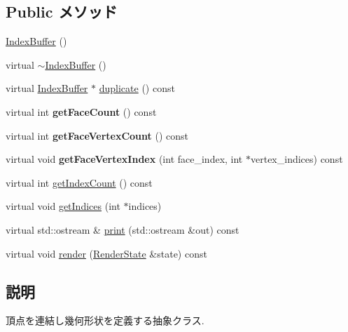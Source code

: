 \subsection*{Public メソッド}
\begin{CompactItemize}
\item 
\hyperlink{classm3g_1_1IndexBuffer_d2e68a2d7c6c753d3abfeef42ee79427}{IndexBuffer} ()
\item 
virtual \hyperlink{classm3g_1_1IndexBuffer_ac7952364fe4d2d7b2731da5380c841c}{$\sim$IndexBuffer} ()
\item 
virtual \hyperlink{classm3g_1_1IndexBuffer}{IndexBuffer} $\ast$ \hyperlink{classm3g_1_1IndexBuffer_fab6fc0a0ec393e527f849c3af10ad76}{duplicate} () const 
\item 
\hypertarget{classm3g_1_1IndexBuffer_f4554e20b080880f27da67c539bb6748}{
virtual int \textbf{getFaceCount} () const }
\label{classm3g_1_1IndexBuffer_f4554e20b080880f27da67c539bb6748}

\item 
\hypertarget{classm3g_1_1IndexBuffer_007506f2b3f5563a65e4cfc1007d57ff}{
virtual int \textbf{getFaceVertexCount} () const }
\label{classm3g_1_1IndexBuffer_007506f2b3f5563a65e4cfc1007d57ff}

\item 
\hypertarget{classm3g_1_1IndexBuffer_d2721de0db09f6c65d9d4b088a269171}{
virtual void \textbf{getFaceVertexIndex} (int face\_\-index, int $\ast$vertex\_\-indices) const }
\label{classm3g_1_1IndexBuffer_d2721de0db09f6c65d9d4b088a269171}

\item 
virtual int \hyperlink{classm3g_1_1IndexBuffer_fe9ae2993ebcdb93d5ff26d57c81b73e}{getIndexCount} () const 
\item 
virtual void \hyperlink{classm3g_1_1IndexBuffer_650953afac45099025a524ab160b911f}{getIndices} (int $\ast$indices)
\item 
virtual std::ostream \& \hyperlink{classm3g_1_1IndexBuffer_6fea17fa1532df3794f8cb39cb4f911f}{print} (std::ostream \&out) const 
\item 
virtual void \hyperlink{classm3g_1_1IndexBuffer_8babc8a79b78615da51161e94029eea9}{render} (\hyperlink{structm3g_1_1RenderState}{RenderState} \&state) const 
\end{CompactItemize}


\subsection{説明}
頂点を連結し幾何形状を定義する抽象クラス. 


